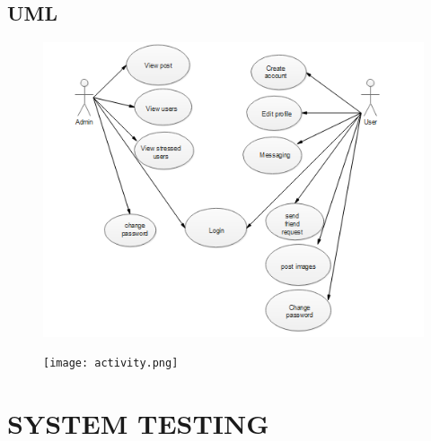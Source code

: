 \documentclass[a4paper,12pt]{article}
\begin{document}
\newpage
\subsection{UML}
\hspace{5mm}
\begin{figure}[h!]
\includegraphics[scale=0.80]{uml1.png}
\end{figure}
\newpage
\hspace{5mm}
\begin{figure}[h!]
\texttt{[image: activity.png]}
\end{figure}
\newpage
\section{SYSTEM TESTING}
\hspace{5mm}
\end{document}
